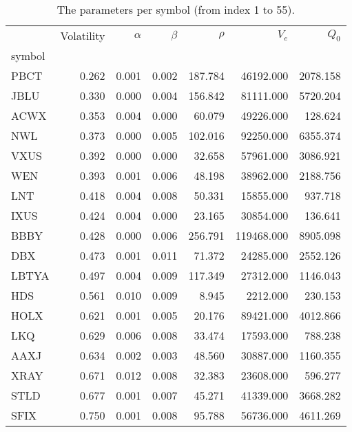 \begin{table}
\centering
\caption{The parameters per symbol (from index 1 to 55).}
\label{tbl:params_0}
\begin{tabular}{lrrrrrr}
\toprule
{} &  Volatility &  $\alpha$ &  $\beta$ &  $\rho$ &     $V_e$  &   $Q_0$  \\
symbol &             &           &          &         &            &          \\
\midrule
PBCT   &       0.262 &     0.001 &    0.002 & 187.784 &  46192.000 & 2078.158 \\
JBLU   &       0.330 &     0.000 &    0.004 & 156.842 &  81111.000 & 5720.204 \\
ACWX   &       0.353 &     0.004 &    0.000 &  60.079 &  49226.000 &  128.624 \\
NWL    &       0.373 &     0.000 &    0.005 & 102.016 &  92250.000 & 6355.374 \\
VXUS   &       0.392 &     0.000 &    0.000 &  32.658 &  57961.000 & 3086.921 \\
WEN    &       0.393 &     0.001 &    0.006 &  48.198 &  38962.000 & 2188.756 \\
LNT    &       0.418 &     0.004 &    0.008 &  50.331 &  15855.000 &  937.718 \\
IXUS   &       0.424 &     0.004 &    0.000 &  23.165 &  30854.000 &  136.641 \\
BBBY   &       0.428 &     0.000 &    0.006 & 256.791 & 119468.000 & 8905.098 \\
DBX    &       0.473 &     0.001 &    0.011 &  71.372 &  24285.000 & 2552.126 \\
LBTYA  &       0.497 &     0.004 &    0.009 & 117.349 &  27312.000 & 1146.043 \\
HDS    &       0.561 &     0.010 &    0.009 &   8.945 &   2212.000 &  230.153 \\
HOLX   &       0.621 &     0.001 &    0.005 &  20.176 &  89421.000 & 4012.866 \\
LKQ    &       0.629 &     0.006 &    0.008 &  33.474 &  17593.000 &  788.238 \\
AAXJ   &       0.634 &     0.002 &    0.003 &  48.560 &  30887.000 & 1160.355 \\
XRAY   &       0.671 &     0.012 &    0.008 &  32.383 &  23608.000 &  596.277 \\
STLD   &       0.677 &     0.001 &    0.007 &  45.271 &  41339.000 & 3668.282 \\
SFIX   &       0.750 &     0.001 &    0.008 &  95.788 &  56736.000 & 4611.269 \\

\end{tabular}
\end{table}
